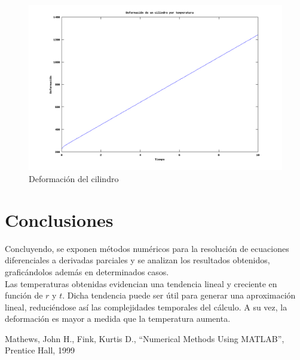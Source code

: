 \documentclass[journal, monochrome]{IEEEtran}
\begin{document}
\begin{figure}
	\centering
	\includegraphics[scale = 0.35]{img/graph_e.png}
	\caption{Deformación del cilindro}
	\label{figure:deformation}
\end{figure}



\vspace{1cm}
\section{Conclusiones}
\label{section:conclusions}
\vspace{0.5cm}

Concluyendo, se exponen métodos numéricos para la resolución de ecuaciones diferenciales a derivadas parciales y se analizan los resultados obtenidos, graficándolos además en determinados casos. \\

Las temperaturas obtenidas evidencian una tendencia lineal y creciente en función de $r$ y $t$. Dicha tendencia puede ser útil para generar una aproximación lineal, reduciéndose así las complejidades temporales del cálculo. A su vez, la deformación es mayor a medida que la temperatura aumenta.




\vspace{1cm}
\begin{thebibliography}{1}
	Mathews, John H.,
	Fink, Kurtis D.,
	``Numerical Methods Using MATLAB'',
	Prentice Hall,
	1999
	
\end{thebibliography}
\end{document}
